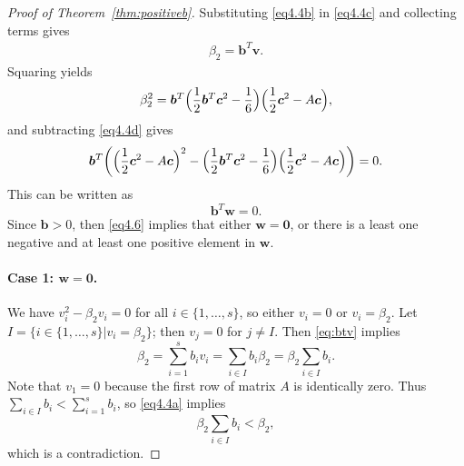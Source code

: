 \begin{proof}[Proof of Theorem~\ref{thm:positiveb}]
    Substituting \eqref{eq4.4b} in \eqref{eq4.4c} and collecting terms gives 
    \begin{align} \label{eq:btv}
        \beta_{2} = \bm{b}^{T}\bm{v}.
    \end{align}
    Squaring yields
    \begin{equation*}%
        \beta_{2}^{2} = \bm{b}^{T}\Bigl(\frac{1}{2}\bm{b}^{T}\bm{c}^{2} - \frac{1}{6}\Bigr)\Bigl(\frac{1}{2}\bm{c}^{2} - A\bm{c}\Bigr),
    \end{equation*}
    and subtracting \eqref{eq4.4d} gives
    \begin{equation*}
        \bm{b}^{T}\biggl(\Bigl(\frac{1}{2}\bm{c}^{2} - A\bm{c}\Bigr)^{2} - \Bigl(\frac{1}{2}\bm{b}^{T}\bm{c}^{2} - \frac{1}{6}\Bigr)\Bigl(\frac{1}{2}\bm{c}^{2} - A\bm{c}\Bigr)\biggr) = 0.
    \end{equation*}
    This can be written as
    \begin{equation}\label{eq4.6}
        \bm{b}^{T}\bm{w} = 0.
    \end{equation}
    Since $\bm{b}>0$, then \eqref{eq4.6} implies that either \( \bm{w} = \bm{0} \),
    or there is a least one negative and at least one positive element in \( \bm{w} \).

\paragraph{Case 1: \( \bm{w} = \bm{0} \).}

We have \( v_{i}^{2} - \beta_{2}v_{i} = 0 \) for all \( i \in \{1,\dots,s\} \), so either \( v_{i} = 0 \) or \( v_{i} = \beta_{2} \).
Let \( I = \{ i \in\{1,\dots,s\} | v_{i} = \beta_{2} \} \); then \( v_{j} = 0 \) for \( j \neq I \). 
Then \eqref{eq:btv} implies 
$$ \beta_{2} = \sum_{i=1}^{s}b_{i}v_{i} = \sum_{i \in I}b_{i}\beta_{2} = \beta_{2}\sum_{i \in I}b_{i}.$$
Note that \( v_{1} = 0 \) because the first row of matrix \( A \) is identically zero. 
Thus $\sum_{i\in I}b_i < \sum_{i=1}^s b_i$, so \eqref{eq4.4a} implies
$$\beta_{2}\sum_{i \in I}b_{i}< \beta_{2},$$
which is a contradiction.


\end{proof}
